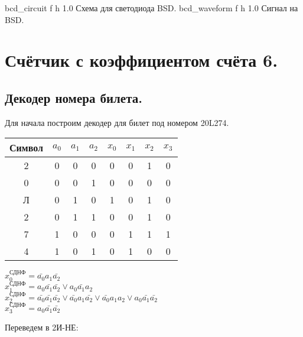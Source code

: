 \documentclass{bmstu}
\begin{document}
	{bcd_circuit}
	{f} %
	{h} %
	{1.0\textwidth} %
	{Схема для светодиода BSD.} %
	{bcd_waveform}
	{f} %
	{h} %
	{1.0\textwidth} %
	{Сигнал на BSD.} %
	
	
	\chapter{Счётчик с коэффициентом счёта 6.}
	\section{Декодер номера билета.}
	\begin{flushleft}
		Для начала построим декодер для билет под номером 20L274.
	\end{flushleft}

	\begin{center}
		\begin{tabular}{ |c||c|c|c||c|c|c|c| } 
			\hline
			Символ & $a_0$ & $a_1$ & $a_2$ & $x_0$ & $x_1$ & $x_2$ & $x_3$ \\
			\hline
			2 & 0 & 0 & 0 & 0 & 0 & 1 & 0 \\
			0 & 0 & 0 & 1 & 0 & 0 & 0 & 0 \\ 
			Л & 0 & 1 & 0 & 1 & 0 & 1 & 0 \\ 
			2 & 0 & 1 & 1 & 0 & 0 & 1 & 0 \\ 
			7 & 1 & 0 & 0 & 0 & 1 & 1 & 1 \\ 
			4 & 1 & 0 & 1 & 0 & 1 & 0 & 0 \\  
			\hline
		\end{tabular}
	\end{center}
	
	$x_0^{\text{СДНФ}} = \bar{a_0} a_1 \bar{a_2}$ \\
	$x_1^{\text{СДНФ}} = a_0 \bar{a_1} \bar{a_2} \vee a_0 \bar{a_1} a_2$ \\
	$x_2^{\text{СДНФ}} = \bar{a_0} \bar{a_1} \bar{a_2} \vee \bar{a_0} a_1 \bar{a_2} \vee \bar{a_0} a_1 a_2 \vee a_0 \bar{a_1} \bar{a_2}$ \\
	$x_3^{\text{СДНФ}} = a_0 \bar{a_1} \bar{a_2}$ \\
	
	\begin{flushleft}
		Переведем в 2И-НЕ: 
	\end{flushleft}
	
\end{document}
